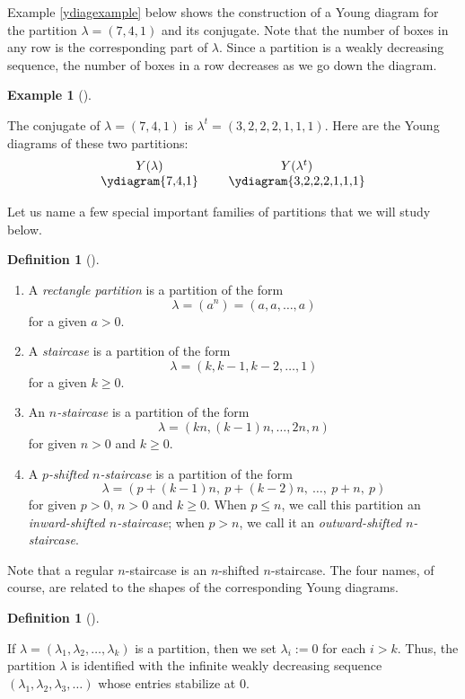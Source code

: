 \documentclass[numbers=enddot,12pt,final,onecolumn,notitlepage]{scrartcl}%
\theoremstyle{definition}
\newtheorem{defi}[theo]{Definition}
\newenvironment{definition}[1][]
{\begin{defi}[#1]\begin{leftbar}}
{\end{leftbar}\end{defi}}
\newtheorem{exam}[theo]{Example}
\newenvironment{example}[1][]
{\begin{exam}[#1]\begin{leftbar}}
{\end{leftbar}\end{exam}}
\newcommand{\tup}[1]{\left( #1 \right)}
\renewcommand{\leq}{\leqslant}
\renewcommand{\geq}{\geqslant}
\theoremstyle{plainsl}
\begin{document}
Example \ref{ydiagexample} below shows the construction of a Young diagram for the partition $\lambda = (7,4,1)$ and its conjugate. Note that the number of boxes in any row is the corresponding part of $\lambda$. Since a partition is a weakly decreasing sequence, the number of boxes in a row decreases as we go down the diagram.

\begin{example}
\label{ydiagexample}
The conjugate of $\lambda = (7,4,1)$ is $\lambda^t =(3,2,2,2,1,1,1)$.
Here are the Young diagrams of these two partitions:
\[
\begin{tabular}{ccc}
$Y(\lambda)$ & & $Y(\lambda^t)$ \\
\ydiagram{7,4,1}
&
&
\ydiagram{3,2,2,2,1,1,1}
\end{tabular}
\]
\end{example}

Let us name a few special important families of partitions that we will study below.

\begin{definition}
\begin{enumerate}
    \item A \emph{rectangle partition} is a partition of the form 
\[\lambda = (a^n) = (a,a, \ldots, a)\]
for a given $a > 0$.
    \item A \emph{staircase} is a partition of the form 
\[\lambda = (k, k-1, k-2, \ldots, 1)\]
for a given $k \geq 0$.
    \item An \emph{$n$-staircase} is a partition of the form 
\[\lambda = (kn, (k-1)n, \ldots, 2n,  n)\]
for given $n > 0$ and $k \geq 0$.
    \item A \emph{$p$-shifted $n$-staircase} is a partition of the form
\[\lambda = (p+(k-1)n, \ p+(k-2)n, \ \ldots, \ p+n, \  p) \]
for given $p > 0$, $n > 0$ and $k \geq 0$.
When $p \leq n$, we call this partition an \emph{inward-shifted $n$-staircase};
when $p > n$, we call it an \emph{outward-shifted $n$-staircase}.
\end{enumerate}

\end{definition}

Note that a regular $n$-staircase is an $n$-shifted $n$-staircase.
The four names, of course, are related to the shapes of the corresponding Young diagrams.

\begin{definition}
If $\lambda = \tup{\lambda_1, \lambda_2, \ldots, \lambda_k}$ is
a partition, then we set $\lambda_i := 0$ for each $i > k$.
Thus, the partition $\lambda$ is identified with the infinite
weakly decreasing
sequence $\tup{\lambda_1, \lambda_2, \lambda_3, \ldots}$
whose entries stabilize at $0$.
\end{definition}
\end{document}
